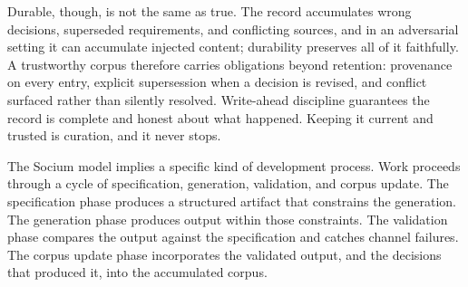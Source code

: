 \documentclass[11pt, a4paper]{article}
\begin{document}
Durable, though, is not the same as true. The record accumulates wrong decisions,
superseded requirements, and conflicting sources, and in an adversarial setting it can
accumulate injected content; durability preserves all of it faithfully. A trustworthy
corpus therefore carries obligations beyond retention: provenance on every entry,
explicit supersession when a decision is revised, and conflict surfaced rather than
silently resolved. Write-ahead discipline guarantees the record is complete and honest
about what happened. Keeping it current and trusted is curation, and it never stops.

The Socium model implies a specific kind of development process. Work proceeds through a
cycle of specification, generation, validation, and corpus update. The specification
phase produces a structured artifact that constrains the generation. The generation phase
produces output within those constraints. The validation phase compares the output against
the specification and catches channel failures. The corpus update phase incorporates the
validated output, and the decisions that produced it, into the accumulated corpus.
\end{document}
